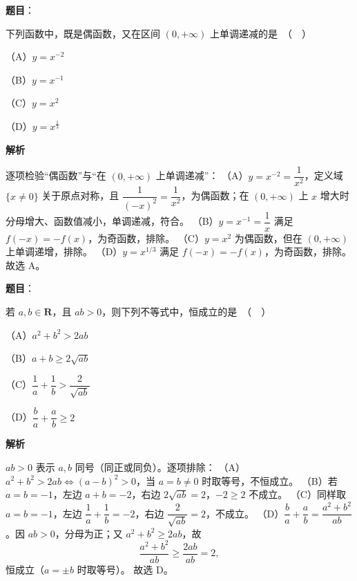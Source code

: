 \begin{answer}

\textbf{题目}：

下列函数中，既是偶函数，又在区间 $(0,+\infty)$ 上单调递减的是　（　）

（A）$y=x^{-2}$

（B）$y=x^{-1}$

（C）$y=x^2$

（D）$y=x^{\frac13}$

\textbf{解析}

逐项检验“偶函数”与“在 $(0,+\infty)$ 上单调递减”：
（A）$y=x^{-2}=\dfrac1{x^2}$，定义域 $\{x\neq0\}$ 关于原点对称，且 $\dfrac1{(-x)^2}=\dfrac1{x^2}$，为偶函数；在 $(0,+\infty)$ 上 $x$ 增大时分母增大、函数值减小，单调递减，符合。
（B）$y=x^{-1}=\dfrac1x$ 满足 $f(-x)=-f(x)$，为奇函数，排除。
（C）$y=x^2$ 为偶函数，但在 $(0,+\infty)$ 上单调递增，排除。
（D）$y=x^{1/3}$ 满足 $f(-x)=-f(x)$，为奇函数，排除。
故选 A。


\end{answer}
\begin{answer}

\textbf{题目}：

若 $a,b\in\mathbf R$，且 $ab>0$，则下列不等式中，恒成立的是　（　）

（A）$a^2+b^2>2ab$

（B）$a+b\geqslant 2\sqrt{ab}$

（C）$\dfrac1a+\dfrac1b>\dfrac{2}{\sqrt{ab}}$

（D）$\dfrac ba+\dfrac ab\geqslant 2$

\textbf{解析}

$ab>0$ 表示 $a,b$ 同号（同正或同负）。逐项排除：
（A）$a^2+b^2>2ab\iff(a-b)^2>0$，当 $a=b\neq0$ 时取等号，不恒成立。
（B）若 $a=b=-1$，左边 $a+b=-2$，右边 $2\sqrt{ab}=2$，$-2\geqslant2$ 不成立。
（C）同样取 $a=b=-1$，左边 $\dfrac1a+\dfrac1b=-2$，右边 $\dfrac2{\sqrt{ab}}=2$，不成立。
（D）$\dfrac ba+\dfrac ab=\dfrac{a^2+b^2}{ab}$。因 $ab>0$，分母为正；又 $a^2+b^2\geqslant2ab$，故
\nopagebreak[4]
\[\frac{a^2+b^2}{ab}\geqslant\frac{2ab}{ab}=2,\]
恒成立（$a=\pm b$ 时取等号）。
故选 D。


\end{answer}
